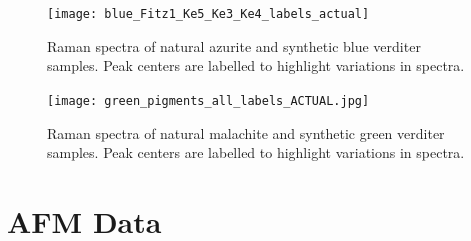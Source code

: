 \begin{figure}[H]
  \centering
  \texttt{[image: blue\_Fitz1\_Ke5\_Ke3\_Ke4\_labels\_actual]}
\caption[Raman spectra of blue samples, peak centers labelled.]{Raman spectra of natural azurite and synthetic blue verditer samples. Peak centers are labelled to highlight variations in spectra.}
\label{fig:blue_comparison3}
\end{figure}

\begin{figure}[H]
\centering
  \texttt{[image: green\_pigments\_all\_labels\_ACTUAL.jpg]}
\caption[Raman spectra of green samples, peak centers labelled.]{Raman spectra of natural malachite and synthetic green verditer samples. Peak centers are labelled to highlight variations in spectra.}
\label{fig:green_comparison}
\end{figure}







\section[AFM Data]{AFM Data}
\label{section3.4}




